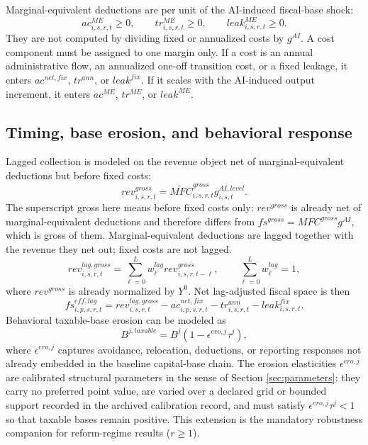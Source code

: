 \documentclass[11pt,a4paper]{article}
\begin{document}
Marginal-equivalent deductions are per unit of the AI-induced fiscal-base shock:
\begin{equation}\label{eq:marginal_equiv_costs_v17}
    ac^{ME}_{i,s,r,t}\geq0,
    \qquad tr^{ME}_{i,s,r,t}\geq0,
    \qquad leak^{ME}_{i,s,r,t}\geq0.
\end{equation}
They are not computed by dividing fixed or annualized costs by $g^{AI}$. A cost component must be assigned to one margin only. If a cost is an annual administrative flow, an annualized one-off transition cost, or a fixed leakage, it enters $ac^{net,fix}$, $tr^{ann}$, or $leak^{fix}$. If it scales with the AI-induced output increment, it enters $ac^{ME}$, $tr^{ME}$, or $leak^{ME}$.

\subsection{Timing, base erosion, and behavioral response}

Lagged collection is modeled on the revenue object net of marginal-equivalent deductions but before fixed costs:
\begin{equation}
    rev^{gross}_{i,s,r,t}=\widetilde{MFC}^{gross}_{i,s,r,t}g^{AI,level}_{i,s,t}.
\end{equation}
The superscript gross here means before fixed costs only: $rev^{gross}$ is already net of marginal-equivalent deductions and therefore differs from $fs^{gross}=MFC^{gross}g^{AI}$, which is gross of them. Marginal-equivalent deductions are lagged together with the revenue they net out; fixed costs are not lagged.
\begin{equation}
    rev^{lag,gross}_{i,s,r,t}=\sum_{\ell=0}^{L}w^{lag}_\ell rev^{gross}_{i,s,r,t-\ell},
    \qquad \sum_{\ell=0}^{L}w^{lag}_\ell=1,
\end{equation}
where $rev^{gross}$ is already normalized by $Y^0$. Net lag-adjusted fiscal space is then
\begin{equation}
    fs^{eff,lag}_{i,p,s,r,t}=rev^{lag,gross}_{i,s,r,t}-ac^{net,fix}_{i,p,s,r,t}-tr^{ann}_{i,s,r,t}-leak^{fix}_{i,s,r,t}.
\end{equation}
Behavioral taxable-base erosion can be modeled as
\begin{equation}
    B^{j,taxable}=B^j(1-\epsilon^{ero,j}\tau^j),
\end{equation}
where $\epsilon^{ero,j}$ captures avoidance, relocation, deductions, or reporting responses not already embedded in the baseline capital-base chain. The erosion elasticities $\epsilon^{ero,j}$ are calibrated structural parameters in the sense of Section \ref{sec:parameters}: they carry no preferred point value, are varied over a declared grid or bounded support recorded in the archived calibration record, and must satisfy $\epsilon^{ero,j}\tau^j<1$ so that taxable bases remain positive.
This extension is the mandatory robustness companion for reform-regime results ($r\geq1$).
\end{document}
